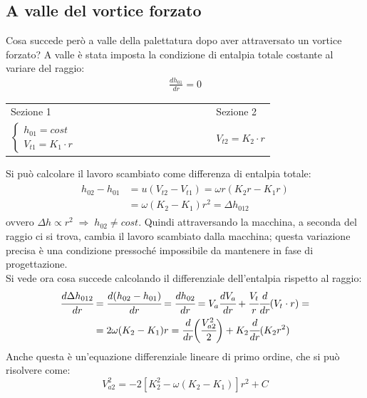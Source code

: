 \subsection{A valle del vortice forzato}
Cosa succede però a valle della palettatura dopo aver attraversato un vortice forzato? A valle è stata imposta la condizione di entalpia totale costante al variare del raggio:
\begin{align*}
\frac{dh_{01}}{dr} = 0
\end{align*}
\begin{center}
\begin{tabular}{l l l l l l l l l l l l l l l}
	Sezione 1 & & & & & & & & & & & & & & Sezione 2\\
	$
	\begin{cases}
		h_{01} = cost\\
		V_{t1} = K_1 \cdot r
	\end{cases}$ & & & & & & & & & & & & & & $V_{t2} = K_2 \cdot r$
\end{tabular}
\end{center}
Si può calcolare il lavoro scambiato come differenza di entalpia totale:
\begin{align*}
\begin{split}
h_{02} - h_{01} &= u (V_{t2} - V_{t1} ) = \omega r (K_2 r - K_1 r) \\
&= \omega (K_2 - K_1) r^2 = \Delta h_{012}
\end{split}
\end{align*}
ovvero $\Delta h \propto r^2 \; \Rightarrow \; h_{02} \neq  cost$. Quindi attraversando la macchina, a seconda del raggio ci si trova, cambia il lavoro scambiato dalla macchina; questa variazione precisa è una condizione pressoché impossibile da mantenere in fase di progettazione.\\
Si vede ora cosa succede calcolando il differenziale dell'entalpia rispetto al raggio:
\begin{align*}
\begin{split}
\cfrac{d \Delta h_{012}}{dr} &= \cfrac{d ( h_{02}-h_{01})}{dr} = \cfrac{dh_{02}}{dr} = V_a \cfrac{dV_a}{dr} + \cfrac{V_t}{r} \cfrac{d}{dr} (V_t \cdot r) = \\
& =2 \omega (K_2 - K_1) r = \cfrac{d}{dr} \bigg( \cfrac{V_{a2}^2}{2} \bigg) + K_2 \cfrac{d}{dr} (K_2 r^2)
\end{split}
\end{align*}
Anche questa è un'equazione differenziale lineare di primo ordine, che si può risolvere come:
\begin{equation}
\boxed{V_{a2}^2 = -2 \left[ K_2^2 - \omega \left( K_2 - K_1 \right) \right] r^2 + C}
\label{eq:valleVorticeForzato}
\end{equation}
